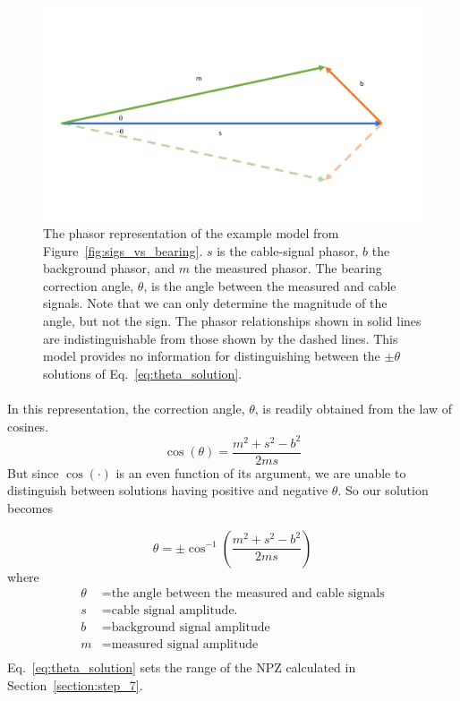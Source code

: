 \documentclass[paper=a4, fontsize=11pt]{scrartcl}
\numberwithin{equation}{section}		%
\numberwithin{figure}{section}			%
\numberwithin{table}{section}				%
\begin{document}
\begin{appendices}
\begin{figure}[h]
  \caption{
  The phasor representation of the example model from Figure~\ref{fig:sigs_vs_bearing}. $s$ is the cable-signal phasor, $b$ the background phasor, and $m$ the measured phasor.  The bearing correction angle, $\theta$, is the angle between the measured and cable signals.  Note that we can only determine the magnitude of the angle, but not the sign.  The phasor relationships shown in solid lines are indistinguishable from those shown by the dashed lines.  This model provides no information for distinguishing between the $\pm\theta$ solutions of Eq.~\ref{eq:theta_solution}.}
  \label{fig:phasor_base}
  \centering
  \includegraphics[width=1.0\textwidth]{figures/phasor_base.pdf}
\end{figure}

\paragraph{}
 In this representation, the correction angle, $\theta$, is readily obtained from the law of cosines.
\begin{equation} \label{eq:law_of_cos}
    \cos\left(\theta\right) = \frac{m^2 + s^2 - b^2}{2ms}
\end{equation}
But since $\cos\left(\cdot\right)$ is an even function of its argument, we are unable to distinguish between solutions having positive and negative $\theta$.  So our solution becomes

\begin{equation} \label{eq:theta_solution}
\theta = \pm \cos^{-1}\left(\frac{m^2 + s^2 - b^2}{2ms}\right)
\end{equation}
where
\begin{align*}
        \theta &= \text{the angle between the measured and cable signals}\\
        s &= \text{cable signal amplitude.}\\
        b &= \text{background signal amplitude} \\
        m &= \text{measured signal amplitude} \\
\end{align*}
Eq.~\ref{eq:theta_solution} sets the range of the NPZ calculated in Section~\ref{section:step_7}.  



\end{appendices}
\end{document}
